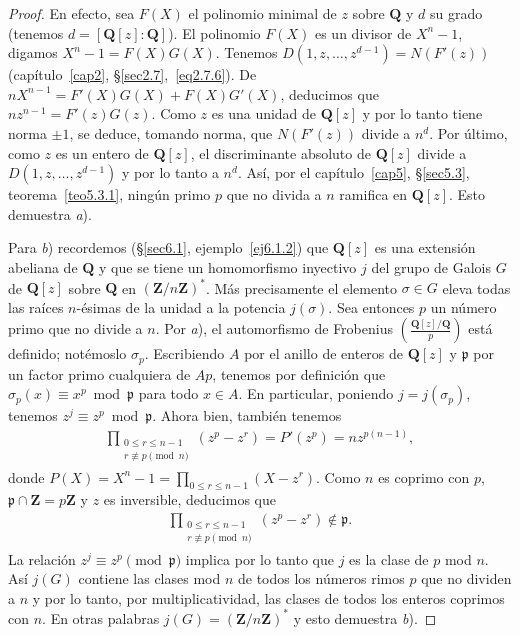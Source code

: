 \documentclass[oneside,bibtotoc,leqno,spanish]{amsbook}
\newcommand{\QQ}{\mathbf{Q}}
\newcommand{\ZZ}{\mathbf{Z}}
\newcommand{\idl}[1]{\mathfrak{#1}}
\numberwithin{equation}{section}
\theoremstyle{defi}
\theoremstyle{note}
\theoremstyle{rem}
\numberwithin{theorem}{section}
\numberwithin{proposition}{section}
\numberwithin{definition}{section}
\numberwithin{lemma}{section}
\numberwithin{corollary}{section}
\numberwithin{example}{section}
\numberwithin{footnote}{section}%
\begin{document}
\begin{proof}
En efecto, sea $F(X)$ el polinomio minimal de $z$ sobre $\QQ$ y $d$ su grado
(tenemos $d = [\QQ[z]:\QQ]$). El polinomio $F(X)$ es un divisor de $X^{n}-1$, digamos
$X^{n}-1=F(X)G(X)$. Tenemos $D(1,z,\dots,z^{d-1}) = N(F'(z))$ (cap\'itulo~\ref{cap2}, \S\ref{sec2.7},~\eqref{eq2.7.6}).
De $nX^{n-1}=F'(X)G(X)+F(X)G'(X)$, deducimos que $nz^{n-1}=F'(z)G(z)$. Como $z$ es una unidad de
$\QQ[z]$ y por lo tanto tiene norma $\pm 1$, se deduce, tomando norma, que $N(F'(z))$ divide a $n^{d}$.
Por \'ultimo, como $z$ es un entero de $\QQ[z]$, el discriminante absoluto de $\QQ[z]$ divide a
$D(1,z,\dots,z^{d-1})$ y por lo tanto a $n^{d}$. As\'i, por el cap\'itulo~\ref{cap5}, \S\ref{sec5.3},
teorema~\ref{teo5.3.1},
ning\'un primo $p$ que no divida a $n$ ramifica en $\QQ[z]$. Esto demuestra {\itshape a}).

Para {\itshape b}) recordemos (\S\ref{sec6.1}, ejemplo~\ref{ej6.1.2}) que $\QQ[z]$ es una extensi\'on abeliana de $\QQ$ y
que se tiene un homomorfismo inyectivo $j$ del grupo de Galois $G$ de $\QQ[z]$ sobre $\QQ$ en
$(\ZZ/n\ZZ)^{*}$. M\'as precisamente el elemento $\sigma\in G$ eleva todas las ra\'ices $n$-\'esimas de la
unidad a la potencia $j(\sigma)$. Sea entonces $p$ un n\'umero primo que no divide a $n$. Por {\itshape a}),
el automorfismo de Frobenius $\left(\frac{\QQ[z]/\QQ}{p}\right)$ est\'a definido; not\'emoslo $\sigma_{p}$.
Escribiendo $A$ por el anillo de enteros de $\QQ[z]$ y $\idl{p}$ por un factor primo cualquiera de $Ap$,
tenemos por definici\'on que $\sigma_{p}(x)\equiv x^{p}\bmod\idl{p}$ para todo $x\in A$. En particular, poniendo
$j = j(\sigma_{p})$, tenemos $z^{j}\equiv z^{p}\bmod\idl{p}$. Ahora bien, tambi\'en tenemos
\begin{gather*}
\prod_{\substack{0\leq r\leq n-1\\ r\not\equiv p\pmod n}}(z^{p}-z^{r})=P'(z^{p}) = nz^{p(n-1)},
\end{gather*}
donde $P(X) = X^{n}-1 = \prod_{0\leq r\leq n-1}(X-z^{r})$. Como $n$ es coprimo con $p$,
$\idl{p}\cap\ZZ = p\ZZ$ y $z$ es inversible, deducimos que
\begin{gather*}
\prod_{\substack{0\leq r\leq n-1\\ r\not\equiv p\pmod n}}(z^{p}-z^{r})\notin\idl{p}.
\end{gather*}
La relaci\'on $z^{j}\equiv z^{p}\pmod{\idl{p}}$ implica por lo tanto que $j$ es la clase de $p$
mod $n$. As\'i $j(G)$ contiene las clases mod $n$ de todos los n\'umeros rimos $p$ que no dividen a
$n$ y por lo tanto, por multiplicatividad, las clases de todos los enteros coprimos con $n$. En otras
palabras $j(G) = (\ZZ/n\ZZ)^{*}$ y esto demuestra {\itshape b}).
\end{proof}
\end{document}
